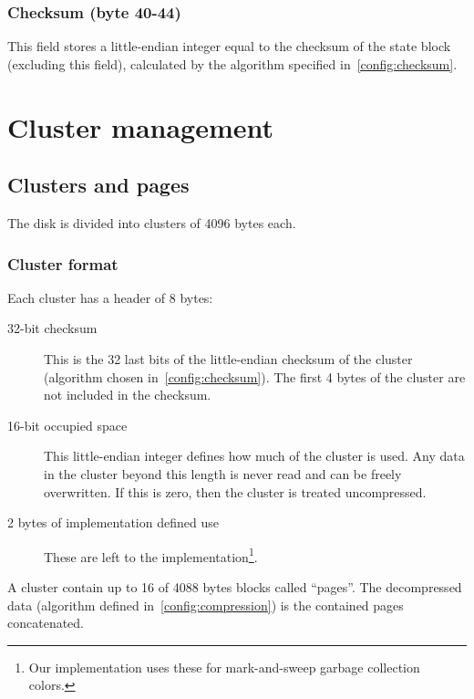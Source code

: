 \documentclass[11pt,a4paper]{report}
\newcommand{\clusterheader}{8 }
\newcommand{\clustersize}{4096 }
\newcommand{\maxpagesincluster}{16 }
\newcommand{\pagesize}{4088 } %
\begin{document}
        \subsection{Checksum (byte 40-44)}
        This field stores a little-endian integer equal to the checksum of the
        state block (excluding this field), calculated by the algorithm
        specified in~\ref{config:checksum}.

    \chapter{Cluster management}

    \section{Clusters and pages}
        The disk is divided into clusters of \clustersize bytes each.

        \subsection{Cluster format}
        Each cluster has a header of \clusterheader bytes:

        \begin{description}
            \item [32-bit checksum] This is the 32 last bits of the
                little-endian checksum of the cluster (algorithm
                chosen in~\ref{config:checksum}). The first 4 bytes of
                the cluster are not included in the checksum.
            \item [16-bit occupied space] This little-endian integer defines
                how much of the cluster is used. Any data in the cluster beyond
                this length is never read and can be freely overwritten. If
                this is zero, then the cluster is treated uncompressed.
            \item [2 bytes of implementation defined use] These are left to the
                implementation\footnote{Our implementation uses these for
                mark-and-sweep garbage collection colors.}.
        \end{description}

        A cluster contain up to \maxpagesincluster of \pagesize bytes blocks
        called ``pages''. The decompressed data (algorithm defined
        in~\ref{config:compression}) is the contained pages concatenated.
\end{document}
